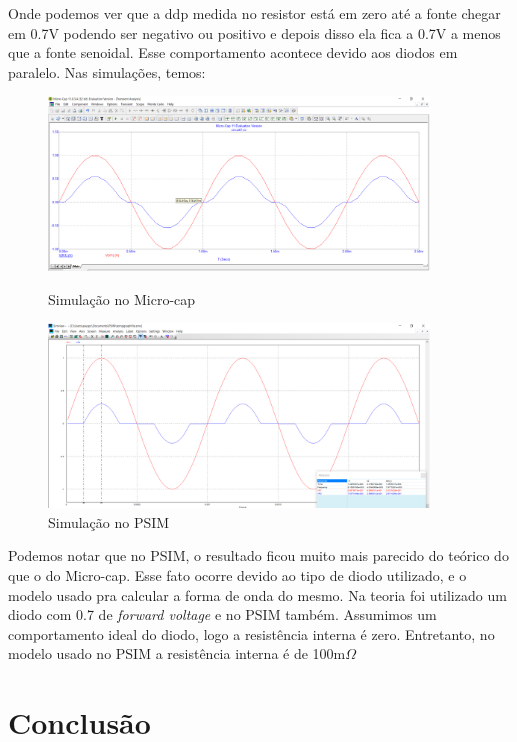     Onde podemos ver que a ddp medida no resistor está em zero até a fonte chegar em 0.7V podendo ser negativo ou positivo e depois disso ela fica a 0.7V a menos que a fonte senoidal. Esse comportamento acontece devido aos diodos em paralelo. Nas simulações, temos:
    
\begin{figure}[!htb]
    \begin{minipage}{0.5\textwidth}
    \centering
    \includegraphics[width = 0.9\textwidth]{Relatorio1_microcap_Diodo.png}
    \caption{Simulação no Micro-cap\cite{microcap}}
    \end{minipage}\hfill
    \begin{minipage}{0.5\textwidth}
    \centering
    \includegraphics[width = 0.9\textwidth]{Relatorio1_PSIM_Diodo.png}
    \caption{Simulação no PSIM\cite{psim}}
    \end{minipage}\hfill
\end{figure}

  Podemos notar que no PSIM, o resultado ficou muito mais parecido do teórico do que o do Micro-cap. Esse fato ocorre devido ao tipo de diodo utilizado, e o modelo usado pra calcular a forma de onda do mesmo. Na teoria foi utilizado um diodo com 0.7 de \textit{forward voltage} e no PSIM também. Assumimos um comportamento ideal do diodo, logo a resistência interna é zero. Entretanto, no modelo usado no PSIM a resistência interna é de 100m$\Omega$










\chapter{Conclusão}\label{cap_concl}



%
%
